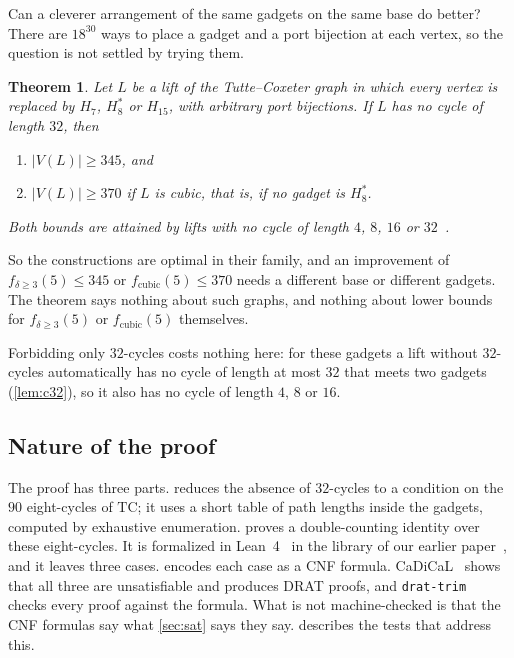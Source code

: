\documentclass[11pt]{amsart}
\newtheorem{theorem}{Theorem}[section]
\theoremstyle{remark}
\newcommand{\code}[1]{\texttt{#1}}
\newcommand{\fd}{f_{\delta\ge 3}}
\newcommand{\fc}{f_{\mathrm{cubic}}}
\newcommand{\Hseven}{H_7}
\newcommand{\Hfifteen}{H_{15}}
\newcommand{\Height}{H_8^{*}}
\newcommand{\TC}{\mathrm{TC}}
\begin{document}
Can a cleverer arrangement of the same gadgets on the same base do better?
There are $18^{30}$ ways to place a gadget and a port bijection at each vertex,
so the question is not settled by trying them.

\begin{theorem}\label{thm:main}
Let $L$ be a lift of the Tutte--Coxeter graph in which every vertex is
replaced by $\Hseven$, $\Height$ or $\Hfifteen$, with arbitrary port
bijections. If $L$ has no cycle of length $32$, then
\begin{enumerate}[label=\textup{(\roman*)}]
\item $|V(L)|\ge 345$, and
\item $|V(L)|\ge 370$ if $L$ is cubic, that is, if no gadget is $\Height$.
\end{enumerate}
Both bounds are attained by lifts with no cycle of length $4$, $8$, $16$ or
$32$~\cite{Marszalek2026a}.
\end{theorem}

So the constructions are optimal in their family, and an improvement of
$\fd(5)\le 345$ or $\fc(5)\le 370$ needs a different base or different gadgets.
The theorem says nothing about such graphs, and nothing about lower bounds
for $\fd(5)$ or $\fc(5)$ themselves.

Forbidding only $32$-cycles costs nothing here: for these gadgets a lift
without $32$-cycles automatically has no cycle of length at most $32$ that
meets two gadgets (\cref{lem:c32}), so it also has no cycle of length $4$, $8$
or $16$.

\subsection*{Nature of the proof}
The proof has three parts.  reduces the absence of
$32$-cycles to a condition on the $90$ eight-cycles of $\TC$; it uses a short
table of path lengths inside the gadgets, computed by exhaustive enumeration.
 proves a double-counting identity over these eight-cycles.
It is formalized in Lean~4~\cite{Lean4} in the library of our earlier
paper~\cite{Marszalek2026a}, and it leaves three cases.  encodes
each case as a CNF formula. CaDiCaL~\cite{CaDiCaL2024} shows that all three are
unsatisfiable and produces DRAT proofs, and \code{drat-trim}~\cite{DRATtrim2014}
checks every proof against the formula. What is not machine-checked is that the
CNF formulas say what \cref{sec:sat} says they say. 
describes the tests that address this.
\end{document}
